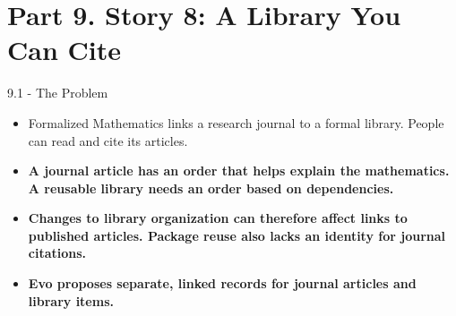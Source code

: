 \documentclass[aspectratio=169,11pt]{beamer}
\begin{document}
\section{Part 9. Story 8: A Library You Can Cite}
\begin{frame}[fragile,t]{9.1 - The Problem}
\begin{itemize}
\setlength{\itemsep}{1pt}
\setlength{\parsep}{0pt}
\setlength{\parskip}{0pt}
\item Formalized Mathematics links a research journal to a formal library. People can read and cite its articles.
\item \textcolor{blue!55!black}{\textbf{A journal article has an order that helps explain the mathematics. A reusable library needs an order based on dependencies.}}
\item \textcolor{blue!55!black}{\textbf{Changes to library organization can therefore affect links to published articles. Package reuse also lacks an identity for journal citations.}}
\item \textcolor{blue!55!black}{\textbf{Evo proposes separate, linked records for journal articles and library items.}}
\end{itemize}
\end{frame}
\end{document}
